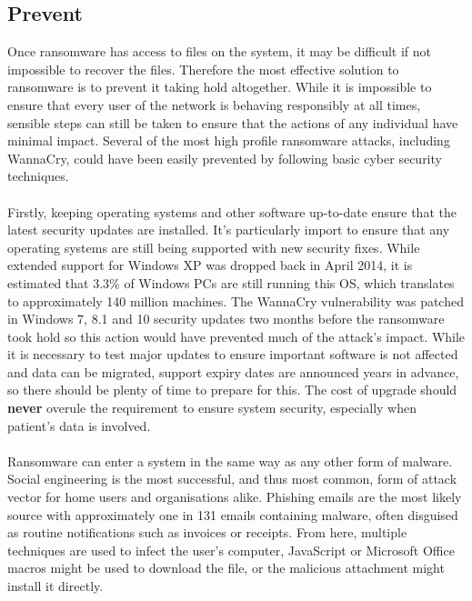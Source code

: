 \documentclass{article}
\begin{document}
\subsection{Prevent}
Once ransomware has access to files on the system, it may be difficult if not impossible to recover the files. Therefore the most effective solution to ransomware is to prevent it taking hold altogether. While it is impossible to ensure that every user of the network is behaving responsibly at all times, sensible steps can still be taken to ensure that the actions of any individual have minimal impact. Several of the most high profile ransomware attacks, including WannaCry, could have been easily prevented by following basic cyber security techniques\cite{gizmodo_prevent_wannacry}.
\\\\
Firstly, keeping operating systems and other software up-to-date ensure that the latest security updates are installed. It's particularly import to ensure that any operating systems are still being supported with new security fixes.
While extended support for Windows XP was dropped back in April 2014, it is estimated that 3.3\% of Windows PCs are still running this OS, which translates to approximately 140 million machines\cite{statcounter}.  The WannaCry vulnerability was patched in Windows 7, 8.1 and 10 security updates\cite{wannacry_patch2, wannacry_patch, windows10march} two months before the ransomware took hold so this action would have prevented much of the attack's impact. While it is necessary to test major updates to ensure important software is not affected and data can be migrated, support expiry dates are announced years in advance\cite{microsoft_lifecycle_factsheet}, so there should be plenty of time to prepare for this. The cost of upgrade should \textbf{never} overule the requirement to ensure system security, especially when patient's data is involved.%
\\\\
Ransomware can enter a system in the same way as any other form of malware. Social engineering is the most successful, and thus most common, form of attack vector for home users and organisations alike.
Phishing emails are the most likely source with approximately one in 131 emails containing malware, often disguised as routine notifications such as invoices or receipts. From here, multiple techniques are used to infect the user's computer, JavaScript or Microsoft Office macros might be used to download the file, or the malicious attachment might install it directly.\cite{symantec_istr}
\end{document}
